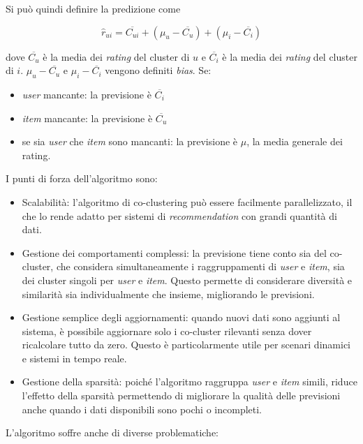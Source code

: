Si può quindi definire la predizione come

\[
\hat{r}_{ui} = \overline{C_{ui}} + (\mu_u - \overline{C_u}) + (\mu_i - \overline{C_i})
\]

dove $\overline{C_u}$ è la media dei \textit{rating} del cluster di $u$ e $\overline{C_i}$ è la media dei \textit{rating} del cluster di $i$. $ \mu_u - \overline{C_u} $ e $ \mu_i - \overline{C_i} $ vengono definiti \textit{bias}. Se: 
\begin{itemize}
  \item \textit{user} mancante: la previsione è $ \overline{C_i} $
  \item \textit{item} mancante: la previsione è $ \overline{C_u} $
  \item se sia \textit{user} che \textit{item} sono mancanti: la previsione è $ \mu $, la media generale dei rating.
\end{itemize}

I punti di forza dell'algoritmo sono:

\begin{itemize}
  \item Scalabilità: l'algoritmo di co-clustering può essere facilmente parallelizzato, il che lo rende adatto per sistemi di \textit{recommendation} con grandi quantità di dati.
  \item Gestione dei comportamenti complessi: la previsione tiene conto sia del co-cluster, che considera simultaneamente i raggruppamenti di \textit{user} e \textit{item}, sia dei cluster singoli per \textit{user} e \textit{item}. Questo permette di considerare diversità e similarità sia individualmente che insieme, migliorando le previsioni.
  \item Gestione semplice degli aggiornamenti: quando nuovi dati sono aggiunti al sistema, è possibile aggiornare solo i co-cluster rilevanti senza dover ricalcolare tutto da zero. Questo è particolarmente utile per scenari dinamici e sistemi in tempo reale.
  \item Gestione della sparsità: poiché l'algoritmo raggruppa \textit{user} e \textit{item} simili, riduce l'effetto della sparsità permettendo di migliorare la qualità delle previsioni anche quando i dati disponibili sono pochi o incompleti.
\end{itemize}

L'algoritmo soffre anche di diverse problematiche:

